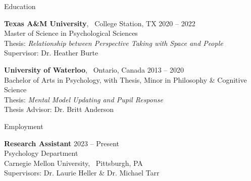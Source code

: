 \documentclass{resume} %
\begin{document}
\fancyhead[RO,LE]{\today}


%
%	
%	


\begin{rSection}{Education}
    
    {\textbf{Texas A\&M University}, \ College Station, TX \hfill {2020 -- 2022}
    \\ {Master of Science in Psychological Sciences}
    \\ Thesis: \textit{Relationship between Perspective Taking with Space and People}
    \\ {Supervisor: Dr. Heather Burte}}

    {\textbf{University of Waterloo}, \ Ontario, Canada \hfill 
    {2013 -- 2020}
    \\ {Bachelor of Arts in Psychology, with Thesis, Minor in Philosophy \& Cognitive Science}
    \\ Thesis: \textit{Mental Model Updating and Pupil Response}
    \\ {Thesis Advisor: Dr. Britt Anderson}}

\end{rSection}


\begin{rSection}{Employment}
	
	{\textbf{Research Assistant} \hfill {2023 -- Present}
		\\ {Psychology Department}
		\\ {Carnegie Mellon University, \ Pittsburgh, PA}
		\\ {Supervisors: Dr. Laurie Heller \& Dr. Michael Tarr}}
	
\end{rSection}
\end{document}
